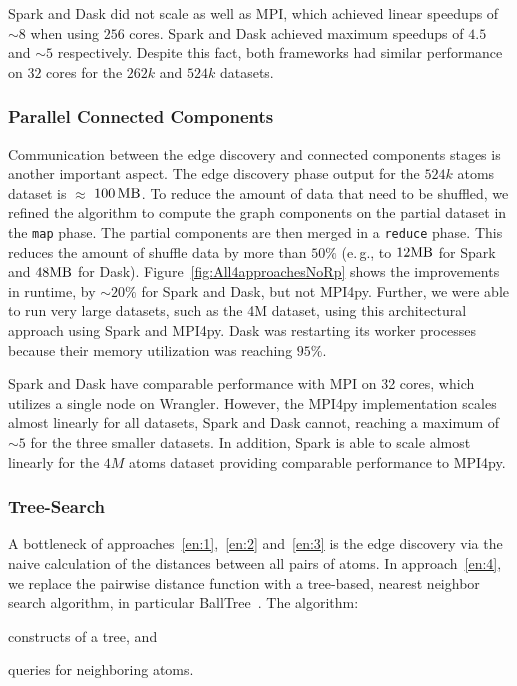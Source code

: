 Spark and Dask did not scale as well as MPI, which achieved linear speedups of $\sim8$ when using $256$ cores.
Spark and Dask achieved maximum speedups of $4.5$ and $\sim5$ respectively.
Despite this fact, both frameworks had similar performance on $32$ cores for the $262k$ and $524k$ datasets.


\subsubsection*{Parallel Connected Components}
Communication between the edge discovery and connected components stages is another important aspect.
The edge discovery phase output for the $524k$ atoms dataset is $\approx$ $100\,\textup{MB}$.
To reduce the amount of data that need to be shuffled, we refined the algorithm to compute the graph components on the partial dataset in the \texttt{map} phase.
The partial components are then merged in a \texttt{reduce} phase.
This reduces the amount of shuffle data by more than $50\%$ (e.\,g., to $12\textup{MB}$ for Spark and $48\textup{MB}$ for Dask).
Figure~\ref{fig:All4approachesNoRp} shows the improvements in runtime, by $\sim20\%$ for Spark and Dask, but not MPI4py.
Further, we were able to run very large datasets, such as the 4M dataset, using this architectural approach using Spark and MPI4py.
Dask was restarting its worker processes because their memory utilization was reaching $95\%$.

Spark and Dask have comparable performance with MPI on 32 cores, which utilizes a single node on Wrangler.
However, the MPI4py implementation scales almost linearly for all datasets, Spark and Dask cannot, reaching a maximum of $\sim5$ for the three smaller datasets.
In addition, Spark is able to scale almost linearly for the $4M$ atoms dataset providing comparable performance to MPI4py.


\subsubsection*{Tree-Search}
A bottleneck of approaches~\ref{en:1},~\ref{en:2} and~\ref{en:3} is the edge discovery via the naive calculation of the distances between all pairs of atoms. 
In approach~\ref{en:4}, we replace the pairwise distance function with a tree-based, nearest neighbor search algorithm, in particular BallTree~\cite{omohundro89five}. 
The algorithm: 
\begin{inparaenum}
    \item constructs of a tree, and
    \item queries for neighboring atoms.
\end{inparaenum}

